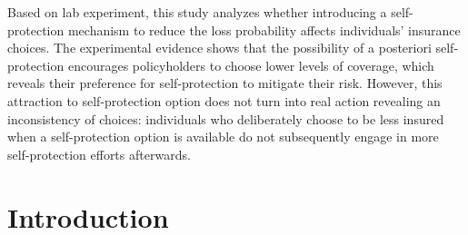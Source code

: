 \begin{Article}
\begin{refsection}[Mouminoux]

\begin{resumeENG}
Based on lab experiment, this study analyzes whether introducing a self-protection mechanism to reduce the loss probability affects individuals' insurance choices. The experimental evidence shows that the possibility of a posteriori self-protection encourages policyholders to choose lower levels of coverage, which reveals their preference for self-protection to mitigate their risk. However, this attraction to self-protection option does not turn into real action revealing an inconsistency of choices: individuals who deliberately choose to be less insured when a self-protection option is available do not subsequently engage in more self-protection efforts afterwards.
\end{resumeENG}





\vspace{1cm}

\section{Introduction}


\end{refsection}
\end{Article}
